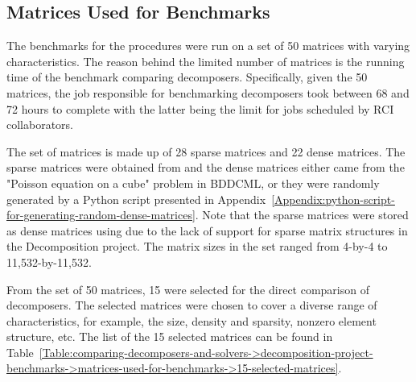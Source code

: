 \subsection{Matrices Used for Benchmarks}\label{Subsection:comparing-decomposers-and-solvers->decomposition-project-benchmarks->matrices-used-for-benchmarks}
The benchmarks for the procedures were run on a set of 50 matrices with varying characteristics.
The reason behind the limited number of matrices is the running time of the benchmark comparing decomposers.
Specifically, given the 50 matrices, the job responsible for benchmarking decomposers took between 68 and 72 hours to complete with the latter being the limit for jobs scheduled by RCI collaborators.

The set of matrices is made up of 28 sparse matrices and 22 dense matrices.
The sparse matrices were obtained from  \cite{Davis2011} and the dense matrices either came from the "Poisson equation on a cube" problem in BDDCML, or they were randomly generated by a Python script presented in Appendix~\ref{Appendix:python-script-for-generating-random-dense-matrices}.
Note that the sparse matrices were stored as dense matrices using  due to the lack of support for sparse matrix structures in the Decomposition project.
The matrix sizes in the set ranged from 4-by-4 to 11,532-by-11,532.

From the set of 50 matrices, 15 were selected for the direct comparison of decomposers.
The selected matrices were chosen to cover a diverse range of characteristics, for example, the size, density and sparsity, nonzero element structure, etc.
The list of the 15 selected matrices can be found in Table~\ref{Table:comparing-decomposers-and-solvers->decomposition-project-benchmarks->matrices-used-for-benchmarks->15-selected-matrices}.

